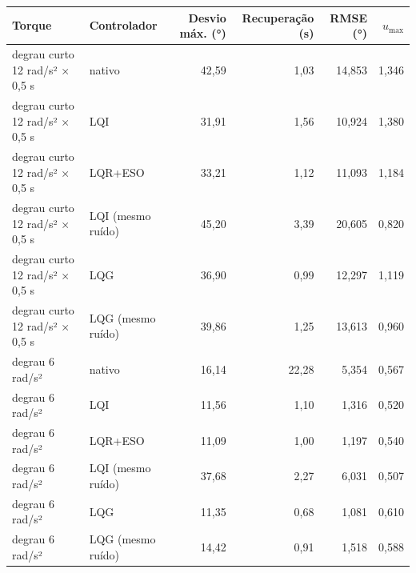 \begin{tabular}{llrrrr}
\toprule
Torque & Controlador & Desvio máx. (\si{\degree}) & Recuperação (\si{\second}) & RMSE (\si{\degree}) & $u_{\max}$ \\
\midrule
degrau curto 12 rad/s² × 0,5 s & nativo & 42,59 & 1,03 & 14,853 & 1,346 \\
degrau curto 12 rad/s² × 0,5 s & LQI & 31,91 & 1,56 & 10,924 & 1,380 \\
degrau curto 12 rad/s² × 0,5 s & LQR+ESO & 33,21 & 1,12 & 11,093 & 1,184 \\
degrau curto 12 rad/s² × 0,5 s & LQI (mesmo ruído) & 45,20 & 3,39 & 20,605 & 0,820 \\
degrau curto 12 rad/s² × 0,5 s & LQG & 36,90 & 0,99 & 12,297 & 1,119 \\
degrau curto 12 rad/s² × 0,5 s & LQG (mesmo ruído) & 39,86 & 1,25 & 13,613 & 0,960 \\
\addlinespace
degrau 6 rad/s² & nativo & 16,14 & 22,28 & 5,354 & 0,567 \\
degrau 6 rad/s² & LQI & 11,56 & 1,10 & 1,316 & 0,520 \\
degrau 6 rad/s² & LQR+ESO & 11,09 & 1,00 & 1,197 & 0,540 \\
degrau 6 rad/s² & LQI (mesmo ruído) & 37,68 & 2,27 & 6,031 & 0,507 \\
degrau 6 rad/s² & LQG & 11,35 & 0,68 & 1,081 & 0,610 \\
degrau 6 rad/s² & LQG (mesmo ruído) & 14,42 & 0,91 & 1,518 & 0,588 \\
\bottomrule
\end{tabular}
